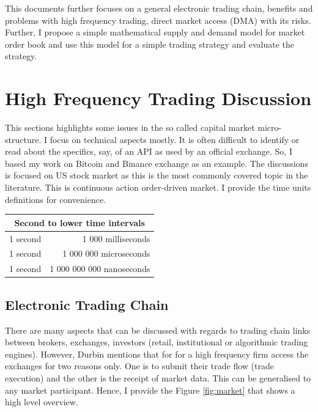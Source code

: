 \documentclass[12pt]{article}
\begin{document}
This documents further focuses on a general electronic trading chain, benefits and problems with high frequency trading, direct market access (DMA) with its risks. Further, I propose a simple mathematical supply and demand model for market order book and use this model for a simple trading strategy and evaluate the strategy.

\section*{High Frequency Trading Discussion}
This sections highlights some issues in the so called capital market micro-structure. I focus on technical aspects mostly. It is often difficult to identify or read about the specifics, say, of an API as used by an official exchange. So, I based my work on Bitcoin and Binance exchange as an example. The discussions is focused on US stock market as this is the most commonly covered topic in the literature. This is continuous action order-driven market.  I provide the time units definitions for convenience.

\begin{center}
\begin{tabular}{|c|r|} 
\hline
\multicolumn{2}{|c|}{Second to lower time intervals} \\
\hline
1 second & 1 000 milliseconds \\ 
1 second & 1 000 000 microseconds \\ 
1 second & 1 000 000 000  nanoseconds \\ 
\hline
\end{tabular}
\end{center}

\subsection*{Electronic Trading Chain}
There are many aspects that can be discussed with regards to trading chain links between brokers, exchanges, investors (retail, institutional or algorithmic trading engines). However, Durbin \cite{durbin} mentions that for for a high frequency firm access the exchanges for two reasons only. One is to submit their trade flow (trade execution) and the other is the receipt of market data. This can be generalised to any market participant. Hence, I provide the Figure \ref{fig:market} that shows a high level overview.
\end{document}
